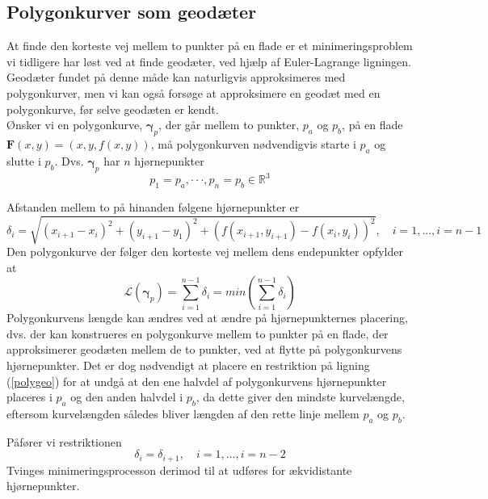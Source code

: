 \subsection{Polygonkurver som geodæter}
At finde den korteste vej mellem to punkter på en flade er et minimeringsproblem vi tidligere har løst ved at finde geodæter, ved hjælp af Euler-Lagrange ligningen. Geodæter fundet på denne måde kan naturligvis approksimeres med polygonkurver, men vi kan også forsøge at approksimere en geodæt med en polygonkurve, før selve geodæten er kendt. \\
Ønsker vi en polygonkurve, \(\pmb{\gamma}_p\), der går mellem to punkter, \(p_a\) og \(p_b\), på en flade \(\pmb{F}(x,y)=(x,y,f(x,y))\), må polygonkurven nødvendigvis starte i \(p_a\) og slutte i \(p_b\). Dvs. \(\pmb{\gamma}_p\) har \(n\) hjørnepunkter 
\begin{equation}
p_1=p_a, \cdot\cdot\cdot, p_n=p_b \in \mathbb{R}^3
\end{equation}

Afstanden mellem to på hinanden følgene hjørnepunkter er
\begin{equation}
\delta_i = \sqrt{\left(x_{i+1}-x_i\right)^2+\left(y_{i+1}-y_1\right)^2+\left(f\left(x_{i+1},y_{i+1}\right) - f\left(x_i,y_i\right)\right)^2}, \quad i=1,...,i=n-1
\end{equation}
Den polygonkurve der følger den korteste vej mellem dens endepunkter opfylder at
\begin{equation}
\mathscr{L}(\pmb{\gamma}_p)=\sum\limits_{i=1}^{n-1}\delta_i=min\left(\sum\limits_{i=1}^{n-1}\delta_i\right)
\label{polygeo}
\end{equation}
Polygonkurvens længde kan ændres ved at ændre på hjørnepunkternes placering, dvs. der kan konstrueres en polygonkurve mellem to punkter på en flade, der approksimerer geodæten mellem de to punkter, ved at flytte på polygonkurvens hjørnepunkter. Det er dog nødvendigt at placere en restriktion på ligning (\ref{polygeo}) for at undgå at den ene halvdel af polygonkurvens hjørnepunkter placeres i \(p_a\) og den anden halvdel i \(p_b\), da dette giver den mindste kurvelængde, eftersom kurvelængden således bliver længden af den rette linje mellem \(p_a\) og \(p_b\).

Påfører vi restriktionen
\begin{equation}
\delta_i = \delta_{i+1}, \quad i=1,...,i=n-2
\end{equation}
Tvinges minimeringsprocesson derimod til at udføres for ækvidistante hjørnepunkter.